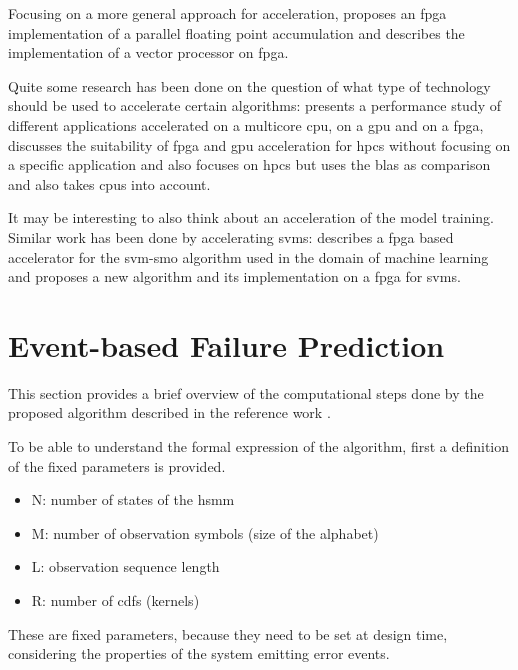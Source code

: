 \documentclass[mscthesis]{usiinfthesis}
\begin{document}
Focusing on a more general approach for acceleration, \cite{ARITH13_Kadric}
proposes an \gls{fpga} implementation of a parallel floating point accumulation
and \cite{ITNG07_Yang} describes the implementation of a vector processor on
\gls{fpga}.

Quite some research has been done on the question of what type of technology
should be used to accelerate certain algorithms: \cite{SASP08_Che} presents
a performance study of different applications accelerated on a multicore
\gls{cpu}, on a \gls{gpu} and on a \gls{fpga}, \cite{FPL10_Jones} discusses the
suitability of \gls{fpga} and \gls{gpu} acceleration for \gls{hpcs} without
focusing on a specific application and \cite{ISVLSI10_Kestur} also focuses on
\gls{hpcs} but uses the \gls{blas} as comparison and also takes \glspl{cpu}
into account.

It may be interesting to also think about an acceleration of the model
training. Similar work has been done by accelerating \glspl{svm}:
\cite{FCCM09_Cadambi} describes a \gls{fpga} based accelerator for the
\gls{svm}-\gls{smo} algorithm used in the domain of machine learning and
\cite{IEEE03_Anguita} proposes a new algorithm and its implementation on
a \gls{fpga} for \glspl{svm}.

\chapter{Event-based Failure Prediction}
\label{ch:event}
\glsresetall %

This section provides a brief overview of the computational steps done by the
proposed algorithm described in the reference work \cite{salfner08}.

To be able to understand the formal expression of the algorithm, first
a definition of the fixed parameters is provided.
\begin{itemize}
    \item N: number of states of the \gls{hsmm}
    \item M: number of observation symbols (size of the alphabet)
    \item L: observation sequence length
    \item R: number of \glspl{cdf} (kernels)
\end{itemize}
These are fixed parameters, because they need to be set at design time,
considering the properties of the system emitting error events.
\end{document}
